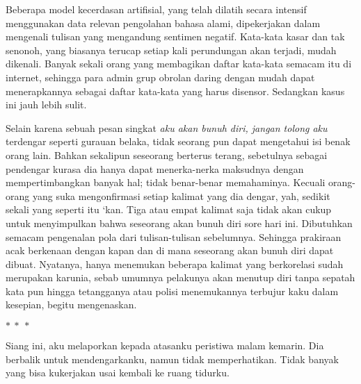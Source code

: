 \documentclass[smalldemyvopaper,11pt,twoside,onecolumn,openright,extrafontsizes]{memoir}
\newcommand\separator{
  \begin{center}
    \(\ast~\ast~\ast\)
  \end{center}
}
\begin{document}

Beberapa model kecerdasan artifisial, yang telah dilatih secara intensif menggunakan data relevan pengolahan bahasa alami, dipekerjakan dalam mengenali tulisan yang mengandung sentimen negatif. Kata-kata kasar dan tak senonoh, yang biasanya terucap setiap kali perundungan akan terjadi, mudah dikenali. Banyak sekali orang yang membagikan daftar kata-kata semacam itu di internet, sehingga para admin grup obrolan daring dengan mudah dapat menerapkannya sebagai daftar kata-kata yang harus disensor. Sedangkan kasus ini jauh lebih sulit.


Selain karena sebuah pesan singkat \textit{aku akan bunuh diri, jangan tolong aku} terdengar seperti gurauan belaka, tidak seorang pun dapat mengetahui isi benak orang lain. Bahkan sekalipun seseorang berterus terang, sebetulnya sebagai pendengar kurasa dia hanya dapat menerka-nerka maksudnya dengan mempertimbangkan banyak hal; tidak benar-benar memahaminya. Kecuali orang-orang yang suka mengonfirmasi setiap kalimat yang dia dengar, yah, sedikit sekali yang seperti itu `kan. Tiga atau empat kalimat saja tidak akan cukup untuk menyimpulkan bahwa seseorang akan bunuh diri sore hari ini. Dibutuhkan semacam pengenalan pola dari tulisan-tulisan sebelumnya. Sehingga prakiraan acak berkenaan dengan kapan dan di mana seseorang akan bunuh diri dapat dibuat. Nyatanya, hanya menemukan beberapa kalimat yang berkorelasi sudah merupakan karunia, sebab umumnya pelakunya akan menutup diri tanpa sepatah kata pun hingga tetangganya atau polisi menemukannya terbujur kaku dalam kesepian, begitu mengenaskan.

\separator{}

Siang ini, aku melaporkan kepada atasanku peristiwa malam kemarin. Dia berbalik untuk mendengarkanku, namun tidak memperhatikan. Tidak banyak yang bisa kukerjakan usai kembali ke ruang tidurku. %


\end{document}
